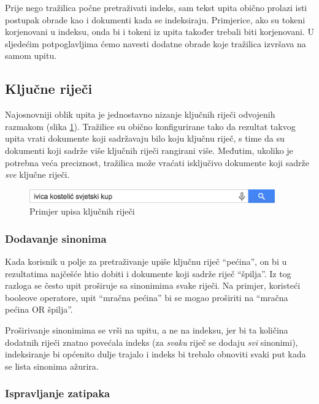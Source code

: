 \documentclass[a4paper,twoside,12pt]{scrreprt}
\begin{document}
Prije nego tražilica počne pretraživati indeks, sam tekst upita obično prolazi isti postupak obrade kao i dokumenti kada se indeksiraju. Primjerice, ako su tokeni korjenovani u indeksu, onda bi i tokeni iz upita također trebali biti korjenovani. U sljedećim potpoglavljima ćemo navesti dodatne obrade koje tražilica izvršava na samom upitu.

\subsection{Ključne riječi}

Najosnovniji oblik upita je jednostavno nizanje ključnih riječi odvojenih razmakom (slika \ref{keywords}). Tražilice su obično konfigurirane tako da rezultat takvog upita vrati dokumente koji sadržavaju bilo koju ključnu riječ, s time da su dokumenti koji sadrže više ključnih riječi rangirani više. Međutim, ukoliko je potrebna veća preciznost, tražilica može vraćati isključivo dokumente koji sadrže \textit{sve} ključne riječi.

\begin{figure}[H]
  \centering
  \includegraphics[width=300pt]{keywords}
  \caption{Primjer upisa ključnih riječi}
  \label{keywords}
\end{figure}

\subsubsection{Dodavanje sinonima}

Kada korisnik u polje za pretraživanje upiše ključnu riječ ``pećina'', on bi u rezultatima najčešće htio dobiti i dokumente koji sadrže riječ ``špilja''. Iz tog razloga se često upit proširuje sa sinonimima svake riječi. Na primjer, koristeći booleove operatore, upit ``mračna pećina'' bi se mogao proširiti na ``mračna pećina OR špilja''.

Proširivanje sinonimima se vrši na upitu, a ne na indeksu, jer bi ta količina dodatnih riječi znatno povećala indeks (za \textit{svaku} riječ se dodaju \textit{svi} sinonimi), indeksiranje bi općenito dulje trajalo i indeks bi trebalo obnoviti svaki put kada se lista sinonima ažurira.

\subsubsection{Ispravljanje zatipaka}
\end{document}
